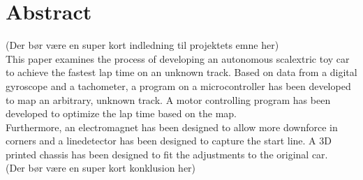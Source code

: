 \section*{Abstract}

(Der bør være en super kort indledning til projektets emne her)
\\
This paper examines the process of developing an autonomous scalextric toy car to achieve the fastest lap time on an unknown track.
Based on data from a digital gyroscope and a tachometer, a program on a microcontroller has been developed to map an arbitrary, unknown track.
A motor controlling program has been developed to optimize the lap time based on the map.
\\
Furthermore, an electromagnet has been designed to allow more downforce in corners and a linedetector has been designed to capture the start line.
A 3D printed chassis has been designed to fit the adjustments to the original car.
\\
(Der bør være en super kort konklusion her)
